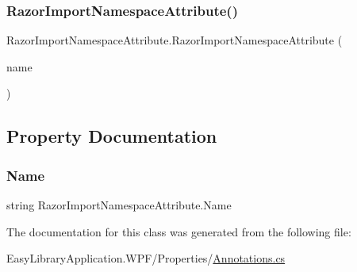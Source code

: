 \subsubsection{\texorpdfstring{Razor\+Import\+Namespace\+Attribute()}{RazorImportNamespaceAttribute()}}
{\footnotesize\ttfamily Razor\+Import\+Namespace\+Attribute.\+Razor\+Import\+Namespace\+Attribute (\begin{DoxyParamCaption}\item[{\mbox{[}\+Not\+Null\mbox{]} string}]{name }\end{DoxyParamCaption})}



\subsection{Property Documentation}
\mbox{\label{class_razor_import_namespace_attribute_a9416e58cf9013104dd4d22007c417a89}} 
\subsubsection{\texorpdfstring{Name}{Name}}
{\footnotesize\ttfamily string Razor\+Import\+Namespace\+Attribute.\+Name\hspace{0.3cm}{\ttfamily [get]}}



The documentation for this class was generated from the following file\+:\begin{DoxyCompactItemize}
\item 
Easy\+Library\+Application.\+W\+P\+F/\+Properties/\mbox{\hyperlink{_annotations_8cs}{Annotations.\+cs}}\end{DoxyCompactItemize}
